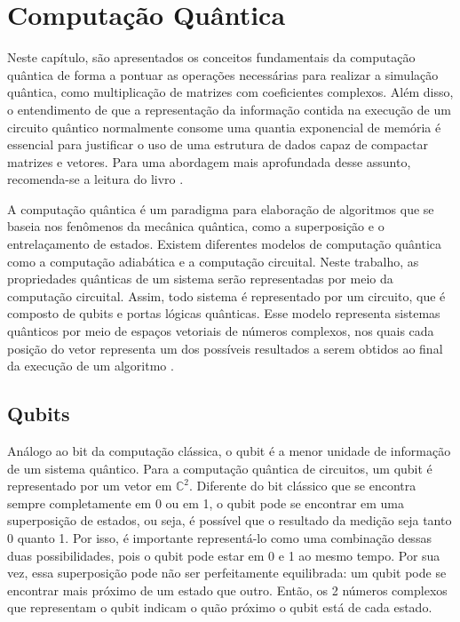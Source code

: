 \chapter{Computação Quântica}\label{chap:compq}

Neste capítulo, são apresentados os conceitos fundamentais da computação quântica de forma a pontuar as operações necessárias para realizar a simulação quântica, como multiplicação de matrizes com coeficientes complexos. Além disso, o entendimento de que a representação da informação contida na execução de um circuito quântico normalmente consome uma quantia exponencial de memória é essencial para justificar o uso de uma estrutura de dados capaz de compactar matrizes e vetores. Para uma abordagem mais aprofundada desse assunto, recomenda-se a leitura do livro \cite{nielsen2010quantum}.

A computação quântica é um paradigma para elaboração de algoritmos que se baseia nos fenômenos da mecânica quântica, como a superposição e o entrelaçamento de estados. Existem diferentes modelos de computação quântica como a computação adiabática \cite{guarienti2016computaccao} e a computação circuital. Neste trabalho, as propriedades quânticas de um sistema serão representadas por meio da computação circuital. Assim, todo sistema é representado por um circuito, que é composto de qubits e portas lógicas quânticas. Esse modelo representa sistemas quânticos por meio de espaços vetoriais de números complexos, nos quais cada posição do vetor representa um dos possíveis resultados a serem obtidos ao final da execução de um algoritmo \cite{nielsen2010quantum}.

\section{Qubits}

Análogo ao bit da computação clássica, o qubit é a menor unidade de informação de um sistema quântico. Para a computação quântica de circuitos, um qubit é representado por um vetor em $\mathbb{C}^2$. Diferente do bit clássico que se encontra sempre completamente em 0 ou em 1, o qubit pode se encontrar em uma superposição de estados, ou seja, é possível que o resultado da medição seja tanto 0 quanto 1. Por isso, é importante representá-lo como uma combinação dessas duas possibilidades, pois o qubit pode estar em 0 e 1 ao mesmo tempo. Por sua vez, essa superposição pode não ser perfeitamente equilibrada: um qubit pode se encontrar mais próximo de um estado que outro. Então, os 2 números complexos que representam o qubit indicam o quão próximo o qubit está de cada estado.

